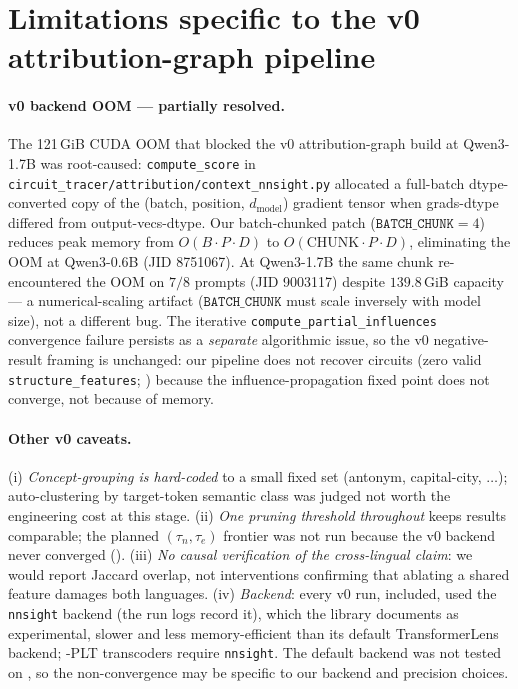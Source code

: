 \section{Limitations specific to the v0 attribution-graph pipeline}\label{app:v0_limitations}

\paragraph{v0 backend OOM --- partially resolved.} The 121\,GiB CUDA OOM that blocked the v0
attribution-graph build at Qwen3-1.7B was root-caused: \texttt{compute\_score} in
\texttt{circuit\_tracer/attribution/context\_nnsight.py} allocated a full-batch
dtype-converted copy of the (batch, position, $d_\text{model}$) gradient tensor when
grads-dtype differed from output-vecs-dtype. Our batch-chunked patch
($\texttt{BATCH\_CHUNK}=4$) reduces peak memory from $O(B\cdot P\cdot D)$ to
$O(\text{CHUNK}\cdot P\cdot D)$, eliminating the OOM at Qwen3-0.6B (JID 8751067). At
Qwen3-1.7B the same chunk re-encountered the OOM on $7/8$ prompts (JID 9003117) despite
$139.8$\,GiB capacity --- a numerical-scaling artifact ($\texttt{BATCH\_CHUNK}$ must scale
inversely with model size), not a different bug. The iterative
\texttt{compute\_partial\_influences} convergence failure persists as a \emph{separate}
algorithmic issue, so the v0 negative-result framing is unchanged: our pipeline does not recover circuits
(zero valid \texttt{structure\_features}; ) because the
influence-propagation fixed point does not converge, not because of memory.

\paragraph{Other v0 caveats.} (i) \emph{Concept-grouping is hard-coded} to a small fixed set
(antonym, capital-city, $\dots$); auto-clustering by target-token semantic class was judged
not worth the engineering cost at this stage. (ii) \emph{One pruning threshold throughout}
keeps results comparable; the planned $(\tau_n,\tau_e)$ frontier was not run because the v0 backend never converged ().
(iii) \emph{No causal verification of the cross-lingual claim}: we would report Jaccard
overlap, not interventions confirming that ablating a shared feature damages both languages.
(iv) \emph{Backend}: every v0 run, \qwen{} included, used the \texttt{nnsight} backend (the run
logs record it), which the library documents as experimental, slower and less memory-efficient
than its default TransformerLens backend; \gemma{}-PLT transcoders require \texttt{nnsight}. The
default backend was not tested on \qwen{}, so the non-convergence may be specific to our backend
and precision choices.

